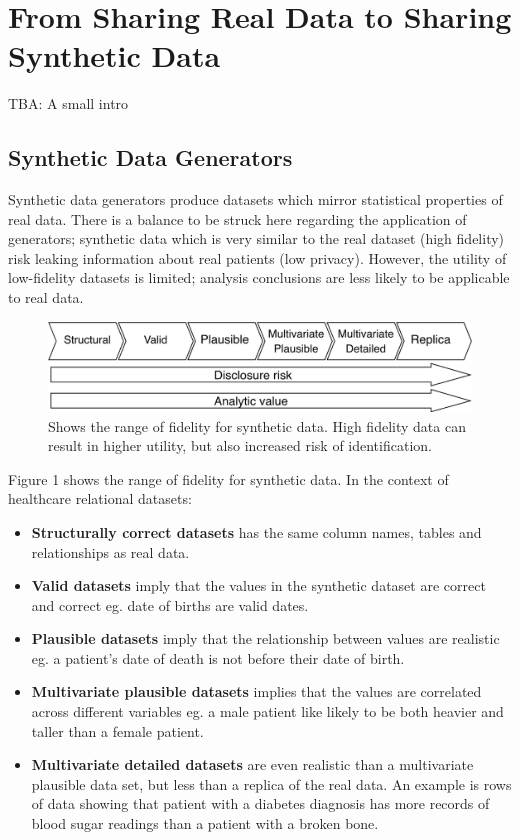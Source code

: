 \documentclass[11pt]{article}
\begin{document}
\section{From Sharing Real Data to Sharing Synthetic Data}
TBA: A small intro

\subsection{Synthetic Data Generators}
Synthetic data generators produce datasets which mirror statistical properties of real data. There is a balance to be struck here regarding the application of generators; synthetic data which is very similar to the real dataset (high fidelity) risk leaking information about real patients (low privacy). However, the utility of low-fidelity datasets is limited; analysis conclusions are less likely to be applicable to real data.

\begin{figure}[ht]
\centering
\includegraphics[width=0.8\linewidth]{figures/ONS.png}
\caption{Shows the range of fidelity for synthetic data. High fidelity data can result in higher utility, but also increased risk of identification.}
\label{fig:Range of fidelity for synthetic data}
\end{figure}

Figure 1 shows the range of fidelity for synthetic data. In the context of healthcare relational datasets: 

\begin{itemize}
    \item \textbf{Structurally correct datasets} has the same column names, tables and relationships as real data. 
    \item \textbf{Valid datasets} imply that the values in the synthetic dataset are correct and correct eg. date of births are valid dates. 
    \item \textbf{Plausible datasets} imply that the relationship between values are realistic eg. a patient's date of death is not before their date of birth.
    \item \textbf{Multivariate plausible datasets} implies that the values are correlated across different variables eg. a male patient like likely to be both heavier and taller than a female patient. 
    \item \textbf{Multivariate detailed datasets} are even realistic than a multivariate plausible data set, but less than a replica of the real data. An example is rows of data showing that patient with a diabetes diagnosis has more records of blood sugar readings than a patient with a broken bone.
\end{itemize}
\end{document}
